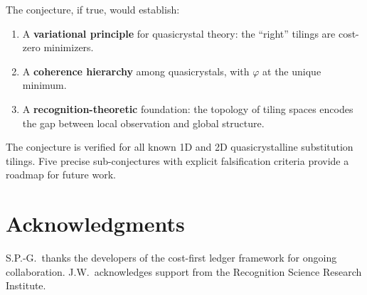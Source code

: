 \documentclass[12pt]{article}
\theoremstyle{definition}
\theoremstyle{remark}
\begin{document}
The conjecture, if true, would establish:
\begin{enumerate}
\item A \textbf{variational principle} for quasicrystal theory: the ``right'' tilings are cost-zero minimizers.
\item A \textbf{coherence hierarchy} among quasicrystals, with $\varphi$ at the unique minimum.
\item A \textbf{recognition-theoretic} foundation: the topology of tiling spaces encodes the gap between local observation and global structure.
\end{enumerate}

The conjecture is verified for all known 1D and 2D quasicrystalline substitution tilings. Five precise sub-conjectures with explicit falsification criteria provide a roadmap for future work.

\section*{Acknowledgments}
S.P.-G.\ thanks the developers of the cost-first ledger framework for ongoing collaboration. J.W.\ acknowledges support from the Recognition Science Research Institute.
\end{document}
